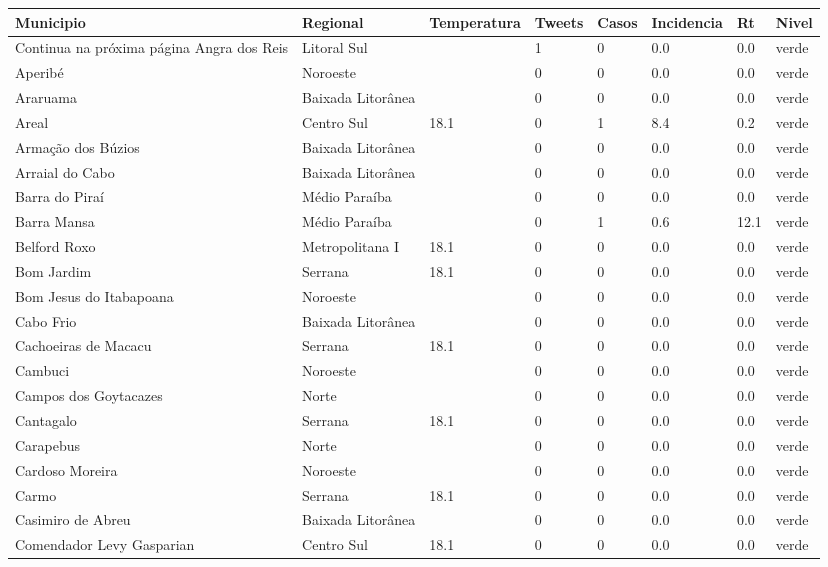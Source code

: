 \begin{longtable}{l|lllllll}
  \hline
Municipio & Regional & Temperatura & Tweets & Casos & Incidencia & Rt & Nivel \\ 
  \hline
\endhead
\hline
{\footnotesize Continua na próxima página}
\endfoot
\endlastfoot
Angra dos Reis & Litoral Sul &  & 1 & 0 & 0.0 & 0.0 & verde \\ 
  Aperibé & Noroeste &  & 0 & 0 & 0.0 & 0.0 & verde \\ 
  Araruama & Baixada Litorânea &  & 0 & 0 & 0.0 & 0.0 & verde \\ 
  Areal & Centro Sul & 18.1 & 0 & 1 & 8.4 & 0.2 & verde \\ 
  Armação dos Búzios & Baixada Litorânea &  & 0 & 0 & 0.0 & 0.0 & verde \\ 
  Arraial do Cabo & Baixada Litorânea &  & 0 & 0 & 0.0 & 0.0 & verde \\ 
  Barra do Piraí & Médio Paraíba &  & 0 & 0 & 0.0 & 0.0 & verde \\ 
  Barra Mansa & Médio Paraíba &  & 0 & 1 & 0.6 & 12.1 & verde \\ 
  Belford Roxo & Metropolitana I & 18.1 & 0 & 0 & 0.0 & 0.0 & verde \\ 
  Bom Jardim & Serrana & 18.1 & 0 & 0 & 0.0 & 0.0 & verde \\ 
  Bom Jesus do Itabapoana & Noroeste &  & 0 & 0 & 0.0 & 0.0 & verde \\ 
  Cabo Frio & Baixada Litorânea &  & 0 & 0 & 0.0 & 0.0 & verde \\ 
  Cachoeiras de Macacu & Serrana & 18.1 & 0 & 0 & 0.0 & 0.0 & verde \\ 
  Cambuci & Noroeste &  & 0 & 0 & 0.0 & 0.0 & verde \\ 
  Campos dos Goytacazes & Norte &  & 0 & 0 & 0.0 & 0.0 & verde \\ 
  Cantagalo & Serrana & 18.1 & 0 & 0 & 0.0 & 0.0 & verde \\ 
  Carapebus & Norte &  & 0 & 0 & 0.0 & 0.0 & verde \\ 
  Cardoso Moreira & Noroeste &  & 0 & 0 & 0.0 & 0.0 & verde \\ 
  Carmo & Serrana & 18.1 & 0 & 0 & 0.0 & 0.0 & verde \\ 
  Casimiro de Abreu & Baixada Litorânea &  & 0 & 0 & 0.0 & 0.0 & verde \\ 
  Comendador Levy Gasparian & Centro Sul & 18.1 & 0 & 0 & 0.0 & 0.0 & verde \\ 

\end{longtable}
